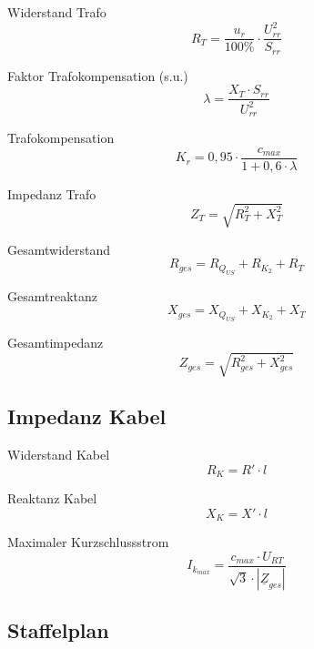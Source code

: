 \documentclass[11pt, a4paper, final, fleqn, twocolumn]{article}
\numberwithin{equation}{subsection}
\begin{document}
\noindent Widerstand Trafo
\begin{equation}
    R_T = \frac{u_r}{100\%} \cdot \frac{U_{rr}^2}{S_{rr}}
\end{equation}

\noindent Faktor Trafokompensation (s.u.)
\begin{equation}
    \lambda = \frac{X_T \cdot S_{rr}}{U_{rr}^2}
\end{equation}

\noindent Trafokompensation
\begin{equation}
    K_r = 0,95 \cdot \frac{c_{max}}{1 + 0,6 \cdot \lambda}
\end{equation}

\noindent Impedanz Trafo
\begin{equation}
    Z_T = \sqrt{R_T^2 + X_T^2}
\end{equation}

\noindent Gesamtwiderstand
\begin{equation}
    R_{ges} = R_{Q_{US}} + R_{K_{2}} + R_T
\end{equation}

\noindent Gesamtreaktanz
\begin{equation}
    X_{ges} = X_{Q_{US}} + X_{K_{2}} + X_T
\end{equation}

\noindent Gesamtimpedanz
\begin{equation}
    Z_{ges} = \sqrt{R_{ges}^2 + X_{ges}^2}
\end{equation}


\subsection{Impedanz Kabel}

Widerstand Kabel
\begin{equation}
    R_{K} = R' \cdot l
\end{equation}

\noindent Reaktanz Kabel
\begin{equation}
    X_{K} = X' \cdot l
\end{equation}

\noindent Maximaler Kurzschlussstrom
\begin{equation}
    I_{k_{max}} = \frac{c_{max} \cdot U_{RT}}{\sqrt{3} \cdot |\underline{Z}_{ges}|}
\end{equation}


\subsection{Staffelplan}
\end{document}
